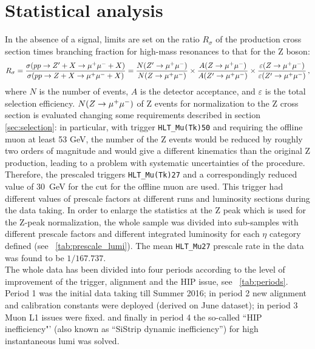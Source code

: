 \section{Statistical analysis}
In the absence of a signal, limits are set on the ratio $R_{\sigma}$ of the production cross section times branching fraction for high-mass resonances to that for the Z boson:
\begin{equation}
R_\sigma = \frac{\sigma(pp\to Z'+X\to\mu^{+}\mu^{-}+X)}{\sigma(pp\to Z+X\to\mu^{+}\mu^{-}+X)} =
\frac{ N(Z'\to\mu^{+}\mu^{-}) }{N(Z\to\mu^{+}\mu^{-})} \times \frac{ A(Z\to\mu^{+}\mu^{-})}{ A(Z'\to\mu^{+}\mu^{-}) } \times \frac{ \varepsilon(Z\to\mu^{+}\mu^{-}) }{\varepsilon(Z'\to\mu^{+}\mu^{-})}\,,
\label{eqn:r}
\end{equation}
where $N$ is the number of events, $A$ is the detector acceptance, and $\varepsilon$ is the total selection efficiency. $N(Z\to\mu^{+}\mu^{-})$ 
of Z events for normalization to the Z cross section is evaluated changing some requirements described in section \ref{sec:selection}: in particular, with trigger \texttt{HLT\_Mu(Tk)50} and requiring the offline muon \pt at least 53 GeV, the number of the Z events would be reduced by roughly two orders of magnitude and would give a different kinematics than the original Z production, leading to a problem with systematic uncertainties of the procedure. Therefore, the prescaled triggers \texttt{HLT\_Mu(Tk)27} and a correspondingly reduced value of 30~GeV for the \pt cut for the offline muon are used. This trigger had different values of prescale factors at different runs and luminosity sections during the data taking. In order to enlarge the statistics at the Z peak which is used for the Z-peak normalization, the whole sample was divided into sub-samples with different prescale factors and different integrated luminosity for each $\eta$ category defined (see \tablename~\ref{tab:prescale_lumi}). The mean \texttt{HLT\_Mu27} prescale rate in the data was found to be $1/167.737$. \\
The whole data has been divided into four periods according to the level of improvement of the trigger, alignment and the HIP issue, see \tablename~\ref{tab:periods}.
Period 1 was the initial data taking till Summer 2016; in period 2 new alignment and calibration constants were deployed (derived on June dataset); in period 3 Muon L1 issues were fixed.
and finally in period 4 the so-called ``HIP inefficiency"' (also known as ``SiStrip dynamic inefficiency'') for high instantaneous lumi was solved.

